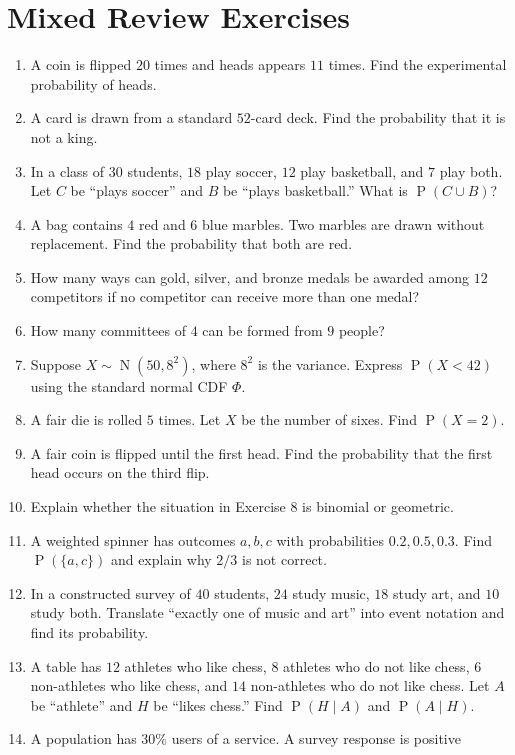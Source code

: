 \documentclass[11pt]{article}
\newcommand{\Pp}{\operatorname{P}}
\newcommand{\N}{\operatorname{N}}
\begin{document}
\section{Mixed Review Exercises}\label{sec:review}
\begin{enumerate}
\item A coin is flipped $20$ times and heads appears $11$ times.  Find the
experimental probability of heads.
\item A card is drawn from a standard $52$-card deck.  Find the probability that
it is not a king.
\item In a class of $30$ students, $18$ play soccer, $12$ play basketball, and
$7$ play both.  Let $C$ be ``plays soccer'' and $B$ be ``plays basketball.''
What is $\Pp(C\cup B)$?
\item A bag contains $4$ red and $6$ blue marbles.  Two marbles are drawn without
replacement.  Find the probability that both are red.
\item How many ways can gold, silver, and bronze medals be awarded among $12$
competitors if no competitor can receive more than one medal?
\item How many committees of $4$ can be formed from $9$ people?
\item Suppose $X\sim\N(50,8^2)$, where $8^2$ is the variance.  Express
$\Pp(X<42)$ using the standard normal CDF $\Phi$.
\item A fair die is rolled $5$ times.  Let $X$ be the number of sixes.  Find
$\Pp(X=2)$.
\item A fair coin is flipped until the first head.  Find the probability that the
first head occurs on the third flip.
\item Explain whether the situation in Exercise 8 is binomial or geometric.
\item A weighted spinner has outcomes $a,b,c$ with probabilities $0.2,0.5,0.3$.
Find $\Pp(\{a,c\})$ and explain why $2/3$ is not correct.
\item In a constructed survey of $40$ students, $24$ study music, $18$ study art,
and $10$ study both.  Translate ``exactly one of music and art'' into event
notation and find its probability.
\item A table has $12$ athletes who like chess, $8$ athletes who do not like
chess, $6$ non-athletes who like chess, and $14$ non-athletes who do not like
chess.  Let $A$ be ``athlete'' and $H$ be ``likes chess.''  Find $\Pp(H\mid A)$
and $\Pp(A\mid H)$.
\item A population has $30\%$ users of a service.  A survey response is positive

\end{enumerate}
\end{document}
